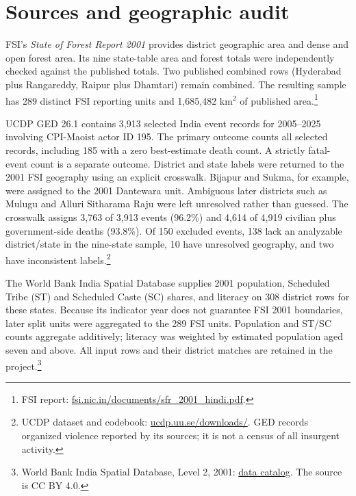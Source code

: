 \documentclass[11pt,a4paper]{article}
\begin{document}
\section{Sources and geographic audit}
FSI's \emph{State of Forest Report 2001} provides district geographic area and dense and open forest area. Its nine state-table area and forest totals were independently checked against the published totals. Two published combined rows (Hyderabad plus Rangareddy, Raipur plus Dhamtari) remain combined. The resulting sample has 289 distinct FSI reporting units and 1,685,482 km$^2$ of published area.\footnote{FSI report: \href{https://fsi.nic.in/documents/sfr_2001_hindi.pdf}{fsi.nic.in/documents/sfr\_2001\_hindi.pdf}.}

UCDP GED 26.1 contains 3,913 selected India event records for 2005--2025 involving CPI-Maoist actor ID 195. The primary outcome counts all selected records, including 185 with a zero best-estimate death count. A strictly fatal-event count is a separate outcome. District and state labels were returned to the 2001 FSI geography using an explicit crosswalk. Bijapur and Sukma, for example, were assigned to the 2001 Dantewara unit. Ambiguous later districts such as Mulugu and Alluri Sitharama Raju were left unresolved rather than guessed. The crosswalk assigns 3,763 of 3,913 events (96.2\%) and 4,614 of 4,919 civilian plus government-side deaths (93.8\%). Of 150 excluded events, 138 lack an analyzable district/state in the nine-state sample, 10 have unresolved geography, and two have inconsistent labels.\footnote{UCDP dataset and codebook: \href{https://ucdp.uu.se/downloads/}{ucdp.uu.se/downloads/}. GED records organized violence reported by its sources; it is not a census of all insurgent activity.}

The World Bank India Spatial Database supplies 2001 population, Scheduled Tribe (ST) and Scheduled Caste (SC) shares, and literacy on 308 district rows for these states. Because its indicator year does not guarantee FSI 2001 boundaries, later split units were aggregated to the 289 FSI units. Population and ST/SC counts aggregate additively; literacy was weighted by estimated population aged seven and above. All input rows and their district matches are retained in the project.\footnote{World Bank India Spatial Database, Level 2, 2001: \href{https://datacatalog.worldbank.org/search/dataset/0062657/india-spatial-database}{data catalog}. The source is CC BY 4.0.}
\end{document}
